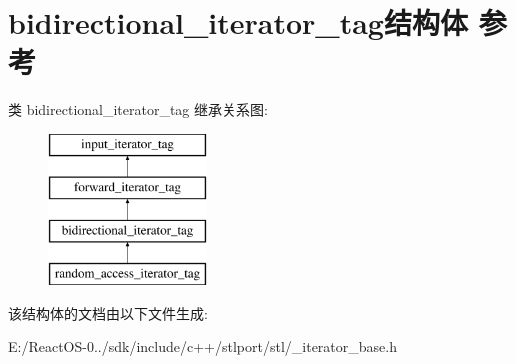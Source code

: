 \hypertarget{structbidirectional__iterator__tag}{}\section{bidirectional\+\_\+iterator\+\_\+tag结构体 参考}
\label{structbidirectional__iterator__tag}
类 bidirectional\+\_\+iterator\+\_\+tag 继承关系图\+:\begin{figure}[H]
\begin{center}
\leavevmode
\includegraphics[height=4.000000cm]{structbidirectional__iterator__tag}
\end{center}
\end{figure}


该结构体的文档由以下文件生成\+:\begin{DoxyCompactItemize}
\item 
E\+:/\+React\+O\+S-\/0../sdk/include/c++/stlport/stl/\+\_\+iterator\+\_\+base.\+h\end{DoxyCompactItemize}
